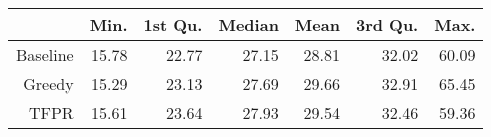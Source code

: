 \begin{table}[ht]
\centering
\begin{tabular}{rrrrrrr}
  \hline
 & Min. & 1st Qu. & Median & Mean & 3rd Qu. & Max. \\ 
  \hline
Baseline & 15.78 & 22.77 & 27.15 & 28.81 & 32.02 & 60.09 \\ 
  Greedy & 15.29 & 23.13 & 27.69 & 29.66 & 32.91 & 65.45 \\ 
  TFPR & 15.61 & 23.64 & 27.93 & 29.54 & 32.46 & 59.36 \\ 
   \hline
\end{tabular}
\end{table}

